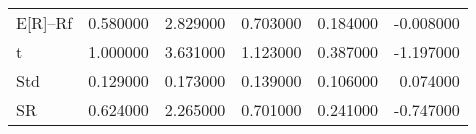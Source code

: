 \begin{tabular}{lrrrrr}
\toprule
\midrule
E[R]--Rf & 0.580000 & 2.829000 & 0.703000 & 0.184000 & -0.008000 \\
t & 1.000000 & 3.631000 & 1.123000 & 0.387000 & -1.197000 \\
Std & 0.129000 & 0.173000 & 0.139000 & 0.106000 & 0.074000 \\
SR & 0.624000 & 2.265000 & 0.701000 & 0.241000 & -0.747000 \\
\bottomrule
\end{tabular}
